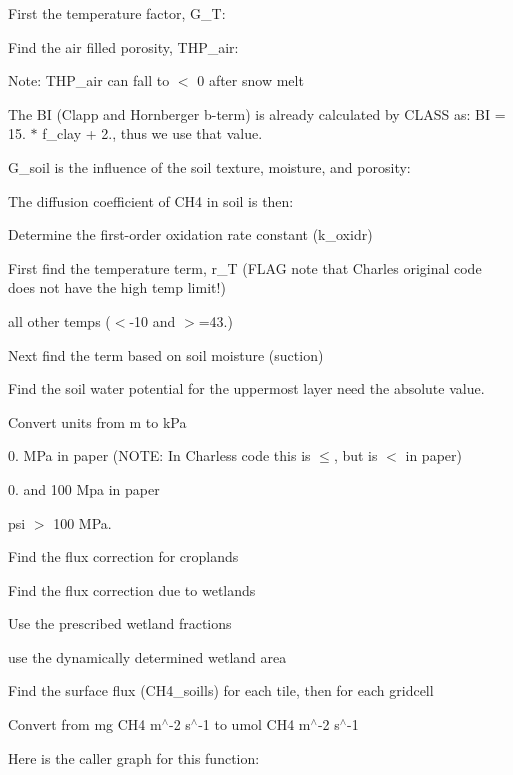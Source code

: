 First the temperature factor, G\+\_\+\+T\+:

Find the air filled porosity, T\+H\+P\+\_\+air\+:

Note\+: T\+H\+P\+\_\+air can fall to $<$ 0 after snow melt

The B\+I (Clapp and Hornberger b-\/term) is already calculated by C\+L\+A\+S\+S as\+: B\+I = 15. $\ast$ f\+\_\+clay + 2., thus we use that value.

G\+\_\+soil is the influence of the soil texture, moisture, and porosity\+:

The diffusion coefficient of C\+H4 in soil is then\+:

Determine the first-\/order oxidation rate constant (k\+\_\+oxidr)

First find the temperature term, r\+\_\+\+T (F\+L\+A\+G note that Charles\textquotesingle{} original code does not have the high temp limit!)

all other temps ($<$-\/10 and $>$=43.)

Next find the term based on soil moisture (suction)

Find the soil water potential for the uppermost layer need the absolute value.

Convert units from m to k\+Pa

0. M\+Pa in paper (N\+O\+T\+E\+: In Charles\textquotesingle{}s code this is $\leq$, but is $<$ in paper)

0. and 100 Mpa in paper

psi $>$ 100 M\+Pa.

Find the flux correction for croplands

Find the flux correction due to wetlands

Use the prescribed wetland fractions

use the dynamically determined wetland area

Find the surface flux (C\+H4\+\_\+soills) for each tile, then for each gridcell

Convert from mg C\+H4 m$^\wedge$-\/2 s$^\wedge$-\/1 to umol C\+H4 m$^\wedge$-\/2 s$^\wedge$-\/1 

Here is the caller graph for this function\+:


